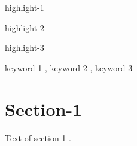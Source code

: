 \documentclass[a4paper,fleqn]{cas-dc}
\begin{document}

\begin{highlights}
\item highlight-1
\item highlight-2
\item highlight-3
\end{highlights}

\begin{keywords}
keyword-1 \sep 
keyword-2 \sep 
keyword-3
\end{keywords}

\maketitle

\section{Section-1}

Text of section-1 \cite{Fortunato2010}.



\end{document}
